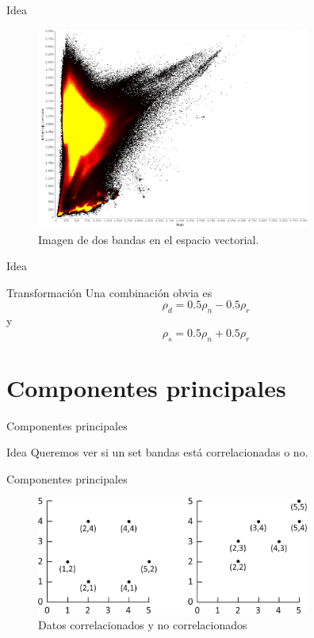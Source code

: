 \documentclass[handout]{beamer}
\begin{document}
\begin{frame}{Idea}
  \begin{figure}
  \centering
  \includegraphics[width=0.8\textwidth]{imagenes/nir-red2.png}
  \caption{Imagen de dos bandas en el espacio vectorial.}
  \end{figure}
\end{frame}

\begin{frame}{Idea}
  \begin{alertblock}{Transformación}
    Una combinación obvia es $$ \rho_d = 0.5\rho_n-0.5\rho_r$$
    y
    $$ \rho_s = 0.5\rho_n+0.5\rho_r $$
  \end{alertblock}
\end{frame}


\section{Componentes principales}
\begin{frame}{Componentes principales}
  \begin{block}{Idea}
    Queremos ver si un set bandas está correlacionadas o no.
  \end{block}
\end{frame}

\begin{frame}{Componentes principales}
  \begin{figure}
  \centering
  \includegraphics[width=0.8\textwidth]{imagenes/corr.png}
  \caption{Datos correlacionados y no correlacionados}
  \end{figure}
\end{frame}
\end{document}
